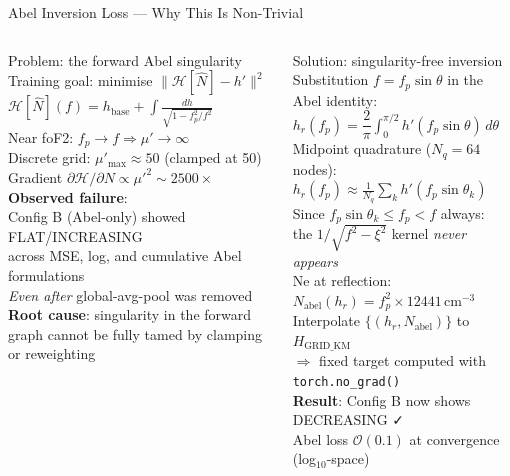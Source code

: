 \documentclass[aspectratio=169,10pt]{beamer}
\begin{document}
\begin{frame}{Abel Inversion Loss — Why This Is Non-Trivial}
\begin{columns}
\begin{alertblock}{Problem: the forward Abel singularity}
  \scriptsize
  Training goal: minimise $\|\mathcal{H}[\hat{N}] - h'\|^2$\\[3pt]
  $\mathcal{H}[\hat{N}](f) = h_\mathrm{base} + \displaystyle\int \frac{dh}{\sqrt{1-f_p^2/f^2}}$\\[4pt]
  Near foF2: $f_p \to f \Rightarrow \mu' \to \infty$\\
  Discrete grid: $\mu'_\mathrm{max} \approx 50$ (clamped at 50)\\
  Gradient $\partial\mathcal{H}/\partial N \propto \mu'^2 \sim 2500\times$ \\[4pt]
  \textbf{Observed failure}:\\
  Config B (Abel-only) showed FLAT/INCREASING\\
  across MSE, log, and cumulative Abel formulations\\
  \emph{Even after} global-avg-pool was removed\\[4pt]
  \textbf{Root cause}: singularity in the forward graph
  cannot be fully tamed by clamping or reweighting
\end{alertblock}

\begin{exampleblock}{Solution: singularity-free inversion}
  \scriptsize
  Substitution $f = f_p\sin\theta$ in the Abel identity:\\[3pt]
  $h_r(f_p) = \dfrac{2}{\pi}\displaystyle\int_0^{\pi/2} h'(f_p\sin\theta)\,d\theta$\\[4pt]
  Midpoint quadrature ($N_q\!=\!64$ nodes):\\
  $h_r(f_p) \approx \tfrac{1}{N_q}\displaystyle\sum_k h'(f_p\sin\theta_k)$\\[4pt]
  Since $f_p\sin\theta_k \leq f_p < f$ always:\\
  \quad the $1/\sqrt{f^2-\xi^2}$ kernel \emph{never appears}\\[4pt]
  Ne at reflection: $N_\mathrm{abel}(h_r) = f_p^2 \times 12441\,\mathrm{cm}^{-3}$\\[4pt]
  Interpolate $\{(h_r, N_\mathrm{abel})\}$ to $H_\mathrm{GRID\_KM}$\\
  $\Rightarrow$ fixed target computed with \texttt{torch.no\_grad()}\\[4pt]
  \textbf{Result}: Config B now shows DECREASING ✓\\
  Abel loss $\mathcal{O}(0.1)$ at convergence (log$_{10}$-space)
\end{exampleblock}
\end{columns}
\end{frame}
\end{document}
